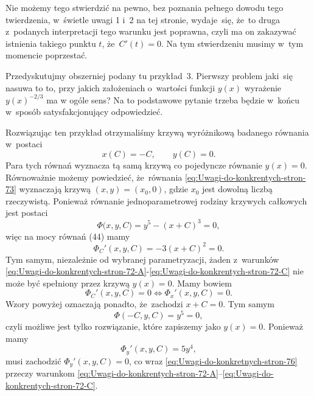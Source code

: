 \documentclass[a4paper,11pt]{article}
\numberwithin{equation}{section}
\begin{document}
Nie możemy tego stwierdzić na pewno, bez poznania pełnego dowodu tego
twierdzenia, w~świetle uwagi 1 i~2 na tej stronie, wydaje~się, że~to druga
z~podanych interpretacji tego warunku jest poprawna, czyli ma on zakazywać
istnienia takiego punktu $t$, że~$C'( t ) = 0$. Na tym stwierdzeniu musimy
w~tym momencie poprzestać.

\VerSpaceFour





\noindent
{} Przedyskutujmy obszerniej podany tu przykład~3. Pierwszy problem
jaki~się nasuwa to to, przy jakich założeniach o~wartości funkcji $y( x )$
wyrażenie $y( x )^{ -2 / 3 }$ ma w ogóle sens? Na to podstawowe pytanie
trzeba będzie w~końcu w~sposób satysfakcjonujący odpowiedzieć.

Rozwiązując ten przykład otrzymaliśmy krzywą wyróżnikową badanego równania
w~postaci
\begin{equation}
  \label{eq:Uwagi-do-konkrentych-stron-73}
  x( C ) = -C, \qquad
  y( C ) = 0.
\end{equation}
Para tych równań wyznacza tą samą krzywą co pojedyncze równanie
$y( x ) = 0$. Równoważnie możemy powiedzieć, że~równania
\eqref{eq:Uwagi-do-konkrentych-stron-73} wyznaczają krzywą
$( x, y ) =( x_{ 0 }, 0 )$, gdzie $x_{ 0 }$ jest dowolną liczbą rzeczywistą.
Ponieważ równanie jednoparametrowej rodziny krzywych całkowych
jest postaci
\begin{equation}
  \label{eq:Uwagi-do-konkretnych-stron-74}
  \Phi\big( x, y, C \big) = y^{ 5 } - ( x + C )^{ 3 } = 0,
\end{equation}
więc na mocy równań (44) mamy
\begin{equation}
  \label{eq:Uwagi-do-konkretnych-stron-75}
  \Phi_{ C }'( x, y, C ) = -3 ( x + C )^{ 2 } = 0.
\end{equation}
Tym samym, niezależnie od wybranej parametryzacji, żaden z~warunków
\eqref{eq:Uwagi-do-konkrentych-stron-72-A}-\eqref{eq:Uwagi-do-konkrentych-stron-72-C} nie może być spełniony przez krzywą $y( x ) = 0$. Mamy bowiem
\begin{equation}
  \label{eq:Uwagi-do-konkretnych-stron-76}
  \Phi_{ C }'( x, y, C ) = 0 \iff
  \Phi_{ x }'( x, y, C ) = 0.
\end{equation}
Wzory powyżej oznaczają ponadto, że~zachodzi $x + C = 0$. Tym samym
\begin{equation}
  \label{eq:Uwagi-do-konkretnych-stron-77}
  \Phi( -C, y, C ) = y^{ 5 } = 0,
\end{equation}
czyli możliwe jest tylko rozwiązanie, które zapiszemy jako $y( x ) = 0$.
Ponieważ mamy
\begin{equation}
  \label{eq:Uwagi-do-konkretnych-stron-78}
  \Phi_{ y }'( x, y, C ) = 5 y^{ 4 },
\end{equation}
musi zachodzić $\Phi_{ y }'( x, y, C ) = 0$, co wraz
\eqref{eq:Uwagi-do-konkretnych-stron-76} przeczy warunkom
\eqref{eq:Uwagi-do-konkrentych-stron-72-A}--\eqref{eq:Uwagi-do-konkrentych-stron-72-C}.
\end{document}

